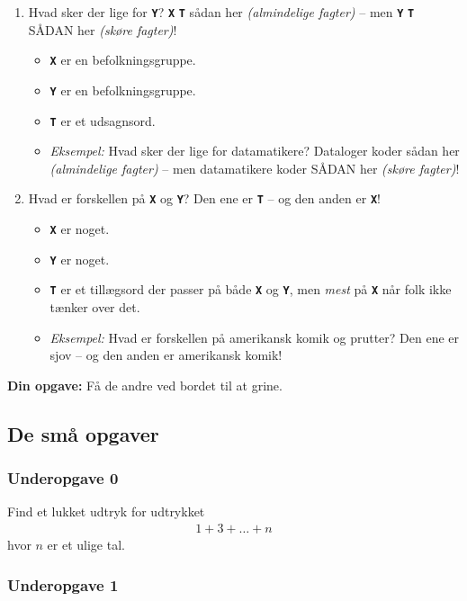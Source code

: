 \newcommand{\var}[1]{\textbf{\texttt{#1}}}
\begin{enumerate}
\item Hvad sker der lige for \var{Y}?  \var{X} \var{T} sådan her
\emph{(almindelige fagter)} -- men \var{Y} \var{T} SÅDAN her \emph{(skøre
fagter)}!
\begin{itemize}
\item \var{X} er en befolkningsgruppe.
\item \var{Y} er en befolkningsgruppe.
\item \var{T} er et udsagnsord.
\item \emph{Eksempel:} Hvad sker der lige for datamatikere?  Dataloger koder
sådan her \emph{(almindelige fagter)} -- men datamatikere koder SÅDAN her
\emph{(skøre fagter)}!
\end{itemize}
\item Hvad er forskellen på \var{X} og \var{Y}?  Den ene er \var{T} -- og den
anden er \var{X}!
\begin{itemize}
\item \var{X} er noget.
\item \var{Y} er noget.
\item \var{T} er et tillægsord der passer på både \var{X} og \var{Y}, men
\emph{mest} på \var{X} når folk ikke tænker over det.
\item \emph{Eksempel:} Hvad er forskellen på amerikansk komik og prutter?  Den
ene er sjov -- og den anden er amerikansk komik!
\end{itemize}
\end{enumerate}

\textbf{Din opgave:} Få de andre ved bordet til at grine.

\newpage

\subsection{De små opgaver}

\subsubsection{Underopgave 0}

Find et lukket udtryk for udtrykket
\begin{align*}
1 + 3 + \ldots + n
\end{align*}
hvor $n$ er et ulige tal.


\subsubsection{Underopgave 1}

